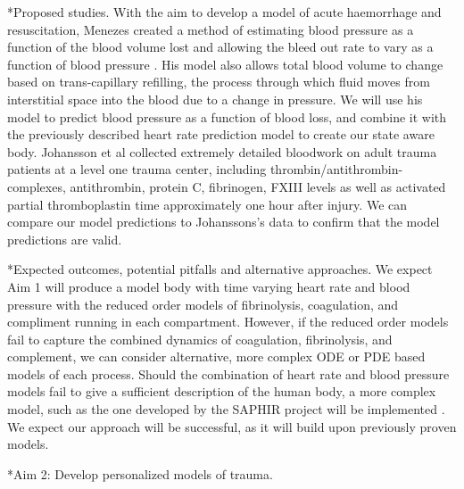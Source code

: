 \documentclass[11pt]{article}
\makeatletter
\renewcommand\subsection{\@startsection
	{subsection}{2}{0mm}
	{-0.05in}
	{-0.5\baselineskip}
	{\normalfont\normalsize\bfseries}}
\renewcommand\subsubsection{\@startsection
	{subsubsection}{2}{0mm}
	{-0.05in}
	{-0.5\baselineskip}
	{\normalfont\normalsize\bfseries}}
\renewcommand\paragraph{\@startsection
  {paragraph}{2}{0mm}
  {-0.05in}
  {-0.5\baselineskip}
  {\normalfont\normalsize\itshape}}
\makeatother
\begin{document}
\subsubsection*{Proposed studies.}
With the aim to develop a model of acute haemorrhage and resuscitation, Menezes created a method of estimating blood pressure as a function of the blood volume lost and allowing the bleed out rate to vary as a function of blood pressure  \citep{menezes1998computer}. His model also allows total blood volume to change based on trans-capillary refilling, the process through which fluid moves from interstitial space into the blood due to a change in pressure. We will use his model to predict blood pressure as a function of blood loss, and combine it with the previously described heart rate prediction model to create our state aware body. Johansson et al collected extremely detailed bloodwork on adult trauma patients at a level one trauma center, including thrombin/antithrombin-complexes, antithrombin, protein C, fibrinogen, FXIII levels as well as activated partial thromboplastin time \citep{johansson2011disseminated} approximately one hour after injury. We can compare our model predictions to Johanssons's data to confirm that the model predictions are valid. 

\paragraph*{Expected outcomes, potential pitfalls and alternative approaches.}
We expect Aim 1 will produce  a model body with time varying heart rate and blood pressure with the reduced order models of fibrinolysis, coagulation, and compliment running in each compartment. However, if the reduced order models fail to capture the combined dynamics of coagulation, fibrinolysis, and complement, we can consider alternative, more complex ODE or PDE based models of each process. Should the combination of heart rate and blood pressure models fail to give a sufficient description of the human body, a more complex model, such as the one developed by the SAPHIR project will be implemented \citep{thomas2008saphir}. We expect our approach will be successful, as it will build upon previously proven models.

\subsection*{Aim 2: Develop personalized models of trauma. }
\end{document}
